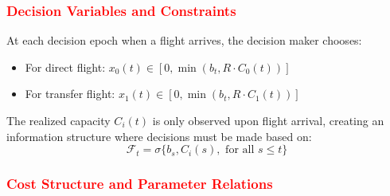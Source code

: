 \documentclass[opre,sglanonrev]{informs4}
\begin{document}
\subsubsection{\textcolor{red}{Decision Variables and Constraints}}

{\color{brown}
At each decision epoch when a flight arrives, the decision maker chooses:
\begin{itemize}
    \item For direct flight: \( x_0(t) \in [0, \min(b_t, R \cdot C_0(t))] \)
    \item For transfer flight: \( x_1(t) \in [0, \min(b_t, R \cdot C_1(t))] \)
\end{itemize}

The realized capacity \( C_i(t) \) is only observed upon flight arrival, creating an information structure where decisions must be made based on:
\[
\mathcal{F}_t = \sigma\{b_s, C_i(s), \text{ for all } s \leq t\}
\]
}

\subsubsection{\textcolor{red}{Cost Structure and Parameter Relations}}
\end{document}
